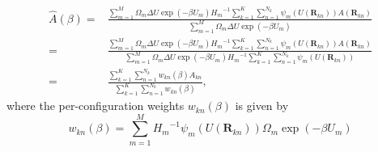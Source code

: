 \begin{align}
\hat{A}(\beta)=&\frac{\sum\limits_{m=1}^M\Omega_m\Delta U\exp{(-\beta U_m)}{H_{m}}^{-1}\sum\limits_{k=1}^K\sum\limits_{n=1}^{N_k}\psi_m(U(\mathbf{R}_{kn}))A(\mathbf{R}_{kn})}{\sum\limits_{m=1}^M\Omega_m\Delta U\exp{(-\beta U_m)}}\\
              =&\frac{\sum\limits_{m=1}^M\Omega_m\Delta U\exp{(-\beta U_m)}{H_{m}}^{-1}\sum\limits_{k=1}^K\sum\limits_{n=1}^{N_k}\psi_m(U(\mathbf{R}_{kn}))A(\mathbf{R}_{kn})}{\sum\limits_{m=1}^M\Omega_m\Delta U\exp{(-\beta U_m)}{H_{m}}^{-1}\sum\limits_{k=1}^K\sum\limits_{n=1}^{N_k}\psi_m(U(\mathbf{R}_{kn}))}\\
              =&\frac{\sum\limits_{k=1}^K\sum\limits_{n=1}^{N_k}w_{kn}(\beta)A_{kn}}{\sum\limits_{k=1}^K\sum\limits_{n=1}^{N_k}w_{kn}(\beta)},
\end{align}
where the per-configuration weights $w_{kn}(\beta)$ is given by
\begin{equation}
w_{kn}(\beta)=\sum\limits_{m=1}^M{H_{m}}^{-1}\psi_m(U(\mathbf{R}_{kn}))\Omega_m\exp{(-\beta U_m)}
\end{equation}

